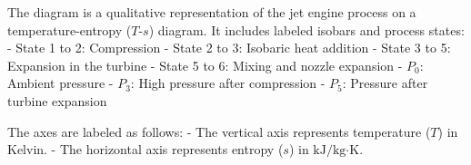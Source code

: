 The diagram is a qualitative representation of the jet engine process on a temperature-entropy (\( T \)-\( s \)) diagram. It includes labeled isobars and process states:  
- State 1 to 2: Compression  
- State 2 to 3: Isobaric heat addition  
- State 3 to 5: Expansion in the turbine  
- State 5 to 6: Mixing and nozzle expansion  
- \( P_0 \): Ambient pressure  
- \( P_3 \): High pressure after compression  
- \( P_5 \): Pressure after turbine expansion  

The axes are labeled as follows:  
- The vertical axis represents temperature (\( T \)) in Kelvin.  
- The horizontal axis represents entropy (\( s \)) in \( \text{kJ}/\text{kg·K} \).